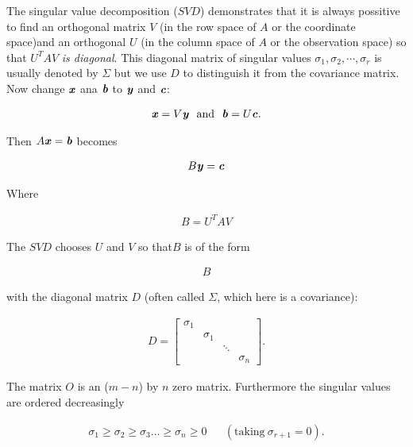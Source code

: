 The singular value decomposition ($SVD$) demonstrates that it is always possitive to find an orthogonal matrix $V$ (in the row space of $A$ or the coordinate space)and an orthogonal $U$ (in the column space of $A$ or the observation space) so that $U^{T}AV$ \textit{is diagonal}. This diagonal matrix of singular values  $\sigma_{1},\sigma_{2},\cdots,\sigma_{r} $ is usually denoted by $ \Sigma$ but we use $D$ to distinguish it from the covariance matrix. Now change $\textbf{\textit{x}}$ ana $\textbf{\textit{b}}$ to $\textbf{\textit{y}}$ and $\textbf{\textit{c}}$:

\begin{align}
\textbf{\textit{x}}=V\textbf{\textit{y}}  \ \ \text{and} \ \ \textbf{\textit{b}}=U\textbf{\textit{c}}. 
\end{align}
\begin{flushleft}
	Then $A \textbf{\textit{x}}=\textbf{\textit{b}}$ becomes
\end{flushleft}
\begin{align}
B\textbf{\textit{y}}=\textbf{\textit{c}}
\end{align}
\begin{flushleft}
	Where
\end{flushleft}
\begin{align}
B=U^{T}AV
\end{align}
\begin{flushleft}
	The $SVD$ chooses $U$ and $V$ so that$ B$ is of the form
\end{flushleft}
\begin{align}
B
\end{align}
\begin{flushleft}
	with the diagonal matrix $D$ (often called $ \Sigma$, which here is a covariance):
\end{flushleft}
\begin{align}
D=
\begin{bmatrix}
\sigma_{1}  & & &\\
& \sigma_{1} & &\\
& & \ddots & \\
& & & \sigma_{n} 
\end{bmatrix}.
\end{align}
\begin{flushleft}
	The matrix $\textit{O}$ is an ($m-n$) by $n$ zero matrix. Furthermore the singular values are ordered decreasingly
\end{flushleft}
\begin{align*}
\sigma_{1}\geq \sigma_{2} \geq \sigma_{3} \ldots \geq \sigma_{n}\geq 0
 & & 
(\text{taking} \ \sigma_{r+1} = 0) .
\end{align*}
